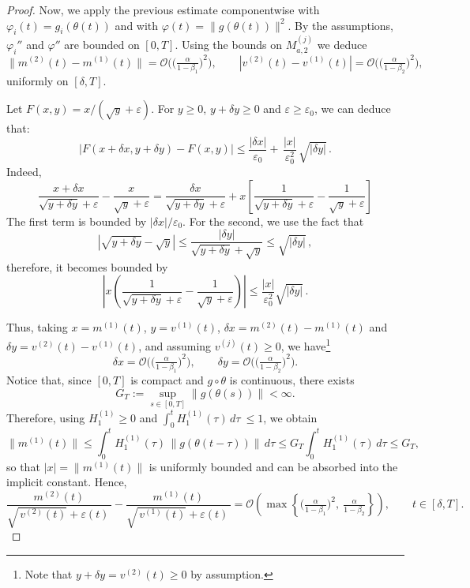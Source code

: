 \documentclass{article} %
\begin{document}
\begin{proof}
Now, we apply the previous estimate componentwise with $\varphi_i(t)=g_i(\theta(t))$ and with $\varphi(t)=\|g(\theta(t))\|^2$. By the assumptions, $\varphi_i''$ and $\varphi''$ are bounded on $[0,T]$. Using the bounds on $M^{(j)}_{a,2}$ we deduce
\[
\|m^{(2)}(t)-m^{(1)}(t)\|
=
\mathcal O\!\Big(\Big(\tfrac{\alpha}{1-\beta_1}\Big)^{\!2}\Big),
\qquad
|v^{(2)}(t)-v^{(1)}(t)|
=
\mathcal O\!\Big(\Big(\tfrac{\alpha}{1-\beta_2}\Big)^{\!2}\Big),
\]
uniformly on $[\delta,T]$.

Let $F(x,y)=x/(\sqrt{y}+\varepsilon)$. For $y\ge 0$, $y+\delta y \geq 0$ and $\varepsilon\ge\varepsilon_0$, we can deduce that:
\[
|F(x+\delta x,y+\delta y)-F(x,y)|
\le
\frac{|\delta x|}{\varepsilon_0}
+
\,\frac{|x|}{\varepsilon_0^2}\,\sqrt{|\delta y|}\,.
\]
Indeed,
\[
\frac{x+\delta x}{\sqrt{y+\delta y}+\varepsilon}-\frac{x}{\sqrt{y}+\varepsilon}
=\frac{\delta x}{\sqrt{y+\delta y}+\varepsilon} + x\left[\frac{1}{\sqrt{y+\delta y} + \varepsilon} - \frac{1}{\sqrt{y}+\varepsilon} \right]
\]
The first term is bounded by $|\delta x|/\varepsilon_0$. For the second, we use the fact that
\[
|\sqrt{y+\delta y}-\sqrt{y}| \leq \frac{|\delta y|}{\sqrt{y+\delta y} + \sqrt{y}}\leq \sqrt{|\delta y|}\,,
\]
therefore, it becomes bounded by
\[
\left|x\!\left(\frac{1}{\sqrt{y+\delta y}+\varepsilon}-\frac{1}{\sqrt{y}+\varepsilon}\right)\right| \leq \frac{|x|}{\varepsilon^2_0} \sqrt{|\delta y|}\,.
\]

Thus, taking $x=m^{(1)}(t)$, $y=v^{(1)}(t)$, $\delta x=m^{(2)}(t)-m^{(1)}(t)$ and $\delta y=v^{(2)}(t)-v^{(1)}(t)$, and assuming $v^{(j)}(t)\ge0$, we have\footnote{Note that $y+\delta y=v^{(2)}(t)\ge 0$ by assumption.}
\[
\delta x=\mathcal{O}\!\Big(\Big(\tfrac{\alpha}{1-\beta_1}\Big)^{\!2}\Big),\qquad
\delta y=\mathcal{O}\!\Big(\Big(\tfrac{\alpha}{1-\beta_2}\Big)^{\!2}\Big).
\]
Notice that, since $[0,T]$ is compact and $g\circ\theta$ is continuous, there exists
\[
G_T:=\sup_{s\in[0,T]}\|g(\theta(s))\|<\infty.
\]
Therefore, using $H^{(1)}_1\ge 0$ and $\int_0^t H^{(1)}_1(\tau)\,d\tau\ \leq 1$, we obtain
\[
\|m^{(1)}(t)\|
\le \int_0^t H^{(1)}_1(\tau)\,\|g(\theta(t-\tau))\|\,d\tau
\le G_T\int_0^t H^{(1)}_1(\tau)\,d\tau
\leq G_T,
\]
so that $|x|=\|m^{(1)}(t)\|$ is uniformly bounded and can be absorbed into the implicit constant. Hence,
\begin{equation}\label{eq:diff_moments_order}
  \frac{m^{(2)}(t)}{\sqrt{\,v^{(2)}(t)}+\varepsilon(t)\,}
-\frac{m^{(1)}(t)}{\sqrt{\,v^{(1)}(t)}+\varepsilon(t)\,}
=
\mathcal{O}\!\left(\max\left\{\Big(\tfrac{\alpha}{1-\beta_1}\Big)^2,\ \tfrac{\alpha}{1-\beta_2}\right\}\right), \qquad t\in[\delta, T].
\end{equation}



\end{proof}
\end{document}
